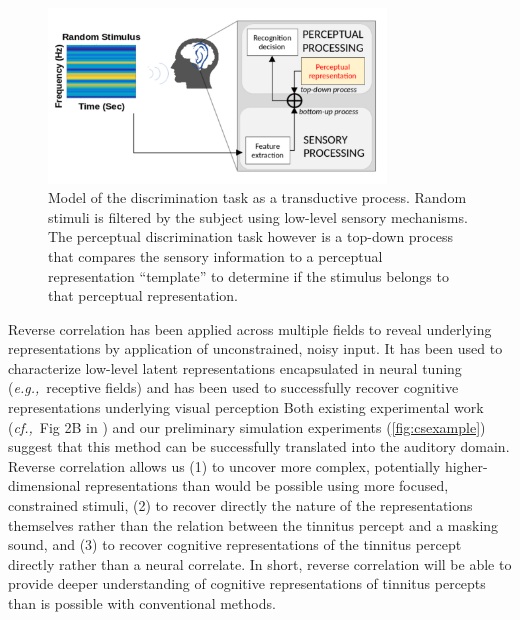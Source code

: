 \documentclass[11pt, notitlepage]{article} %
\def\eg{{\emph{e.g.,}}~}
\def\cf{{\emph{cf.,}}~}
\begin{document}
\begin{figure}[h] %
	\centering
	\includegraphics[width=0.8\textwidth]{Figures/Figures_tinnitus_1.png}
	\caption{Model of the discrimination task as a transductive process.
	Random stimuli is filtered by the subject using low-level sensory mechanisms.
	The perceptual discrimination task however is a top-down process that
	compares the sensory information to a perceptual representation ``template''
	to determine if the stimulus belongs to that perceptual representation.}
	\label{fig:template}
\end{figure}

Reverse correlation has been applied across multiple fields to reveal underlying representations by application of unconstrained, noisy input.
It has been used to characterize low-level latent representations encapsulated in neural tuning
(\eg receptive fields) \cite{ringachReverseCorrelationNeurophysiology2004}
and has been used to successfully recover cognitive representations underlying visual perception \cite{gosselinSuperstitiousPerceptionsReveal2003,}
Both existing experimental work (\cf Fig 2B in \cite{brimijoinInternalRepresentationVowel2013})
and our preliminary simulation experiments (\autoref{fig:csexample}) suggest that this method can be successfully translated
into the auditory domain.
Reverse correlation allows us (1) to uncover more complex, potentially higher-dimensional representations
than would be possible using more focused, constrained stimuli,
(2) to recover directly the nature of the representations themselves rather than the relation
between the tinnitus percept and a masking sound,
and (3) to recover cognitive representations of the tinnitus percept directly rather than a neural correlate.
In short, reverse correlation will be able to provide deeper understanding of cognitive representations of tinnitus percepts
than is possible with conventional methods.
\end{document}
